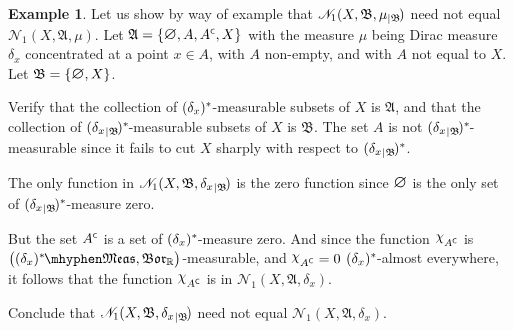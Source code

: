 \documentclass[
twoside=true,
paper=letter,
fontsize=9pt,
pagesize=auto,
leqno,
openany,
headsepline,
overfullrule,
]{scrbook}
\theoremstyle{plain}
\theoremstyle{plain}
\theoremstyle{definition}
\newtheorem{example}[thm]{Example}
\theoremstyle{bfnoteitalic}
\theoremstyle{bfnoteroman}
\newcommand{\sigalg}[1]{\mathfrak{#1}}
\newcommand{\cali}[1]{\mathscr{#1}}
\newcommand{\borel}{\mathfrak{Bor}}
\newcommand{\charfunction}[1]{\mathop{{\raisebox{2pt}{$\chi$}}_{#1}}}
\newcommand{\restrictedto}[1]{_{\lvert#1}\kern-1.5pt}
\newcommand{\mtset}{\hbox{\large{$\varnothing$}}}
\newcommand{\comp}{^{\hbox{\tiny{$\mathsf C$}}}}
\newcommand{\R}{\mathbb{R}}
\newcommand{\sigmaalgebra}{\sigalg{A}}
\newcommand{\sigmaalgebraii}{\sigalg{B}}
\newcommand{\measurable}[1]{{#1}\mhyphen\mathfrak{Meas}}
\newcommand{\kernast}{\ast\kern-1pt}
\newcommand{\measurespace}{X}
\newcommand{\mspaceelt}{x}
\newcommand{\measure}{\mu}
\newcommand{\measmu}{\mu}
\newcommand{\diracmeasure}[1]{\delta_{#1}}
\newcommand{\seti}{A}
\begin{document}
\begin{example}\label{unequal_kernel}
Let us show by way of example that 
$\cali{N}_1(\measurespace, \sigmaalgebraii, \measure\restrictedto{\sigmaalgebraii})$
need not equal 
$\cali{N}_1(\measurespace, \sigmaalgebra, \measure)$.
Let 
$\sigmaalgebra = 
\{ 
\mtset,
\seti,
\seti\comp,
\measurespace
\}$
with the measure $\measmu$ being Dirac measure $\diracmeasure{\mspaceelt}$ concentrated at a point $\mspaceelt\in\seti$, with $\seti$ non-empty, and with $\seti$ not equal to $\measurespace$.
Let
$\sigmaalgebraii = 
\{ 
\mtset,
\measurespace
\}$.

Verify that the collection of
$(\diracmeasure{x})^\kernast$\hyp{}measurable subsets of $\measurespace$ is
$\sigmaalgebra$,
and that the collection of
$({\diracmeasure{x}}\restrictedto{\sigmaalgebraii})^\kernast$\hyp{}measurable subsets of
$\measurespace$
is
$\sigmaalgebraii$.  The set $\seti$ is not
$({\diracmeasure{x}}\restrictedto{\sigmaalgebraii})^\kernast$\hyp{}measurable
since it fails to cut $\measurespace$ sharply with respect to
$({\diracmeasure{x}}\restrictedto{\sigmaalgebraii})^*$.

The only function in
$\cali{N}_1(\measurespace,
\sigmaalgebraii,
{\diracmeasure{x}}\restrictedto{\sigmaalgebraii}
)$
is the zero function since $\mtset$ is the only set of
$({\diracmeasure{x}}\restrictedto{\sigmaalgebraii})^\kernast$\hyp{}measure zero.

But the set
$\seti\comp$
is a set of $(\diracmeasure{x})^\kernast$-measure zero.
And since the function $\charfunction{\seti\comp}$ is
$\bigl(\measurable{(\diracmeasure{\mspaceelt})^\kernast},\borel_\R\bigr)$\hyp{}measurable,
and
$\charfunction{\seti\comp} = 0$ $(\diracmeasure{\mspaceelt})^\kernast$\hyp{}almost everywhere,
it follows that the function
$\charfunction{\seti\comp}$
is in
$\cali{N}_1(\measurespace, \sigmaalgebra,\diracmeasure{\mspaceelt})$.

Conclude that
$\cali{N}_1(\measurespace, \sigmaalgebraii,
{\diracmeasure{x}}\restrictedto{\sigmaalgebraii})$
need not equal
$\cali{N}_1(\measurespace, \sigmaalgebra,
\diracmeasure{\mspaceelt})$.
\end{example}
\end{document}
